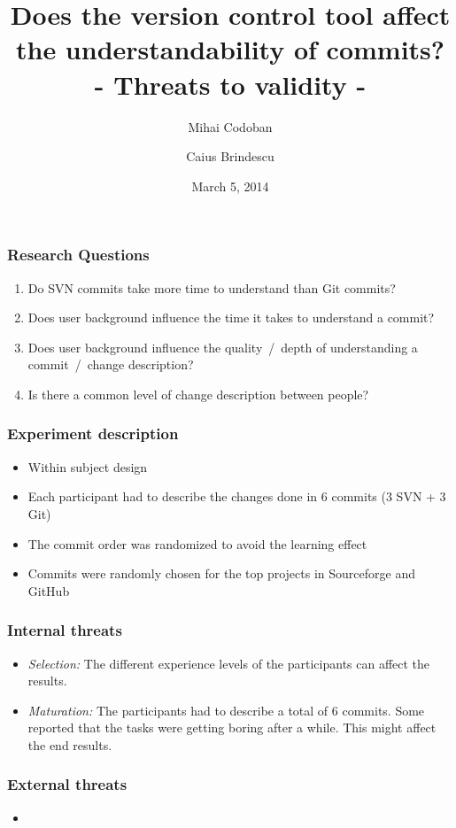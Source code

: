 \documentclass{beamer}
\title{Does the version control tool affect the understandability of commits? \\ - Threats to validity - }
\author{Mihai Codoban \and Caius Brindescu}
\date{March 5, 2014}
\begin{document}
\begin{frame}
\titlepage
\end{frame}

\begin{frame}
\frametitle{Research Questions}
\begin{enumerate}
	\item Do SVN commits take more time to understand than Git commits?
	\item Does user background influence the time it takes to understand a commit?
	\item Does user background influence the quality~/~depth of understanding a commit~/~change description?
	\item Is there a common level of change description between people?
\end{enumerate}
\end{frame}

\begin{frame}
\frametitle{Experiment description}
\begin{itemize}
	\item Within subject design
	\item Each participant had to describe the changes done in 6 commits (3 SVN + 3 Git)
	\item The commit order was randomized to avoid the learning effect
	\item Commits were randomly chosen for the top projects in Sourceforge and GitHub
\end{itemize}
\end{frame}

\begin{frame}
\frametitle{Internal threats}
\begin{itemize}
	\item{\emph{Selection:}} The different experience levels of the participants can affect the results.
	\item{\emph{Maturation:}} The participants had to describe a total of 6 commits. 
	Some reported that the tasks were getting boring after a while.
	This might affect the end results.
\end{itemize}
\end{frame}

\begin{frame}
\frametitle{External threats}
\begin{itemize}
	\item{\emph{}}
\end{itemize}
\end{frame}
\end{document}
